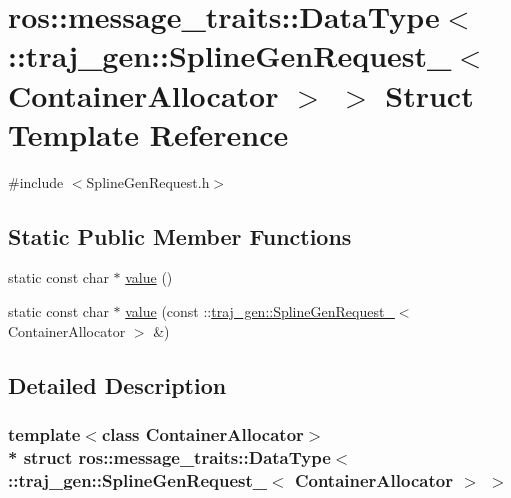 \hypertarget{structros_1_1message__traits_1_1_data_type_3_01_1_1traj__gen_1_1_spline_gen_request___3_01_container_allocator_01_4_01_4}{}\section{ros\+:\+:message\+\_\+traits\+:\+:Data\+Type$<$ \+:\+:traj\+\_\+gen\+:\+:Spline\+Gen\+Request\+\_\+$<$ Container\+Allocator $>$ $>$ Struct Template Reference}
\label{structros_1_1message__traits_1_1_data_type_3_01_1_1traj__gen_1_1_spline_gen_request___3_01_container_allocator_01_4_01_4}


{\ttfamily \#include $<$Spline\+Gen\+Request.\+h$>$}

\subsection*{Static Public Member Functions}
\begin{DoxyCompactItemize}
\item 
static const char $\ast$ \hyperlink{structros_1_1message__traits_1_1_data_type_3_01_1_1traj__gen_1_1_spline_gen_request___3_01_container_allocator_01_4_01_4_ad95d6fa2549039e7036babe5957141d0}{value} ()
\item 
static const char $\ast$ \hyperlink{structros_1_1message__traits_1_1_data_type_3_01_1_1traj__gen_1_1_spline_gen_request___3_01_container_allocator_01_4_01_4_a6b0da019adeec8ef9f47f6297c4d8031}{value} (const \+::\hyperlink{structtraj__gen_1_1_spline_gen_request__}{traj\+\_\+gen\+::\+Spline\+Gen\+Request\+\_\+}$<$ Container\+Allocator $>$ \&)
\end{DoxyCompactItemize}


\subsection{Detailed Description}
\subsubsection*{template$<$class Container\+Allocator$>$\\*
struct ros\+::message\+\_\+traits\+::\+Data\+Type$<$ \+::traj\+\_\+gen\+::\+Spline\+Gen\+Request\+\_\+$<$ Container\+Allocator $>$ $>$}



